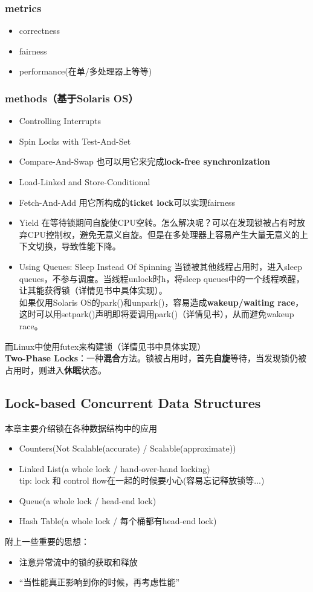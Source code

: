 \documentclass{article}
\begin{document}
\subsubsection{metrics}
\begin{itemize}
    \item correctness
    \item fairness
    \item performance(在单/多处理器上等等)
\end{itemize}
\subsubsection{methods（基于Solaris OS）}
\begin{itemize}
    \item Controlling Interrupts
    \item Spin Locks with Test-And-Set
    \item Compare-And-Swap
    也可以用它来完成\textbf{lock-free synchronization}
    \item Load-Linked and Store-Conditional
    \item Fetch-And-Add
    用它所构成的\textbf{ticket lock}可以实现fairness
    \item Yield
    在等待锁期间自旋使CPU空转。怎么解决呢？可以在发现锁被占有时放弃CPU控制权，避免无意义自旋。但是在多处理器上容易产生大量无意义的上下文切换，导致性能下降。
    \item Using Queues: Sleep Instead Of Spinning
    当锁被其他线程占用时，进入sleep queues，不参与调度。当线程unlock时h，将sleep queues中的一个线程唤醒，让其能获得锁（详情见书中具体实现）。\\
    如果仅用Solaris OS的park()和unpark()，容易造成\textbf{wakeup/waiting race}，这时可以用setpark()声明即将要调用park()（详情见书），从而避免wakeup race。
\end{itemize}
而Linux中使用futex来构建锁（详情见书中具体实现）\\
\textbf{Two-Phase Locks}：一种\textbf{混合}方法。锁被占用时，首先\textbf{自旋}等待，当发现锁仍被占用时，则进入\textbf{休眠}状态。
\subsection{Lock-based Concurrent Data Structures}
本章主要介绍锁在各种数据结构中的应用
\begin{itemize}
    \item Counters(Not Scalable(accurate) / Scalable(approximate))
    \item Linked List(a whole lock / hand-over-hand locking)\\
    tip: lock 和 control flow在一起的时候要小心(容易忘记释放锁等...)
    \item Queue(a whole lock / head-end lock)
    \item Hash Table(a whole lock / 每个桶都有head-end lock)
\end{itemize}
附上一些重要的思想：
\begin{itemize}
    \item 注意异常流中的锁的获取和释放
    \item “当性能真正影响到你的时候，再考虑性能”
\end{itemize}
\end{document}
